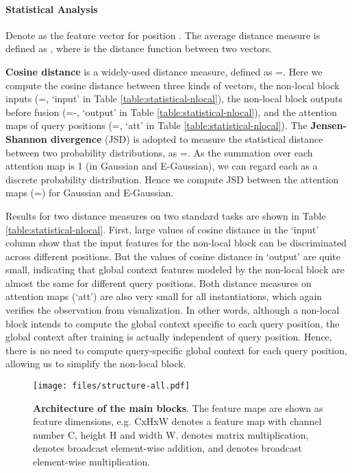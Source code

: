 \documentclass[10pt,twocolumn,letterpaper]{article}
\begin{document}
\paragraph{Statistical Analysis}
Denote  as the feature vector for position . The average distance measure is defined as 
, 
where  is the distance function between two vectors. 

\textbf{Cosine distance} is a widely-used distance measure, defined as =.
Here we compute the cosine distance between three kinds of vectors, the non-local block inputs (=, `input' in Table \ref{table:statistical-nlocal}), the non-local block outputs before fusion (=-, `output' in Table \ref{table:statistical-nlocal}), and the attention maps of query positions (=, `att' in Table \ref{table:statistical-nlocal}).
The \textbf{Jensen-Shannon divergence} (JSD) is adopted to measure the statistical distance between two probability distributions, as =. 
As the summation over each attention map  is 1 (in Gaussian and E-Gaussian), we can regard each  as a discrete probability distribution. Hence we compute JSD between the attention maps (=) for Gaussian and E-Gaussian.

Results for two distance measures on two standard tasks are shown in Table \ref{table:statistical-nlocal}.
First, large values of cosine distance in the `input' column show that the input features for the non-local block can be discriminated across different positions. But the values of cosine distance in `output' are quite small, indicating that global context features modeled by the non-local block are almost the same for different query positions.
Both distance measures on attention maps (`att') are also very small for all instantiations, which again verifies the observation from visualization.
In other words, although a non-local block intends to compute the global context specific to each query position, the global context after training is actually independent of query position.
Hence, there is no need to compute query-specific global context for each query position, allowing us to simplify the non-local block.


\begin{figure*}[!htb]
    \centering
    \texttt{[image: files/structure-all.pdf]}
	\vspace{-5pt}
	\caption{\textbf{Architecture of the main blocks}. The feature maps are shown as feature dimensions, e.g. CxHxW denotes a feature map with channel number C, height H and width W.  denotes matrix multiplication,  denotes broadcast element-wise addition, and  denotes broadcast element-wise multiplication.}
	\label{fig:arch}
	\vspace{-10pt}
\end{figure*}
\end{document}
